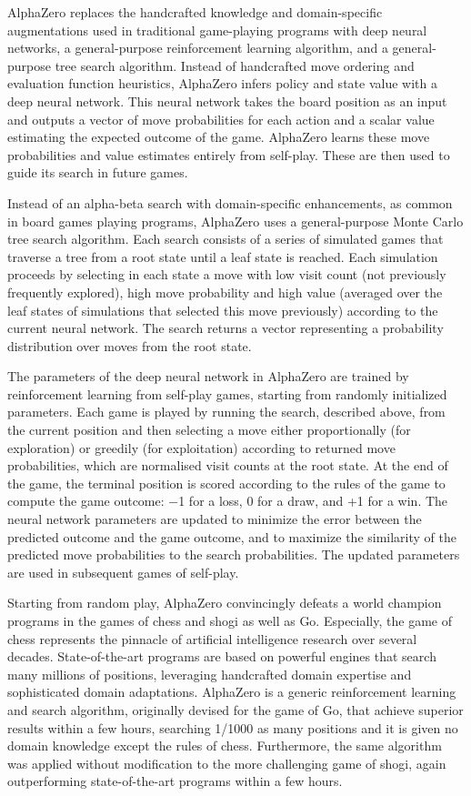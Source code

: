 AlphaZero \cite{Algo.AlphaZero} replaces the handcrafted knowledge and domain-specific augmentations used in traditional game-playing programs with deep neural networks, a general-purpose reinforcement learning algorithm, and a general-purpose tree search algorithm. Instead of handcrafted move ordering and evaluation function heuristics, AlphaZero infers policy and state value with a deep neural network. This neural network takes the board position as an input and outputs a vector of move probabilities for each action and a scalar value estimating the expected outcome of the game. AlphaZero learns these move probabilities and value estimates entirely from self-play. These are then used to guide its search in future games.

Instead of an alpha-beta search with domain-specific enhancements, as common in board games playing programs, AlphaZero uses a general-purpose Monte Carlo tree search \cite{Algo.MCTS} algorithm. Each search consists of a series of simulated games that traverse a tree from a root state until a leaf state is reached. Each simulation proceeds by selecting in each state a move with low visit count (not previously frequently explored), high move probability and high value (averaged over the leaf states of simulations that selected this move previously) according to the current neural network. The search returns a vector representing a probability distribution over moves from the root state.

The parameters of the deep neural network in AlphaZero are trained by reinforcement learning from self-play games, starting from randomly initialized parameters. Each game is played by running the search, described above, from the current position and then selecting a move either proportionally (for exploration) or greedily (for exploitation) according to returned move probabilities, which are normalised visit counts at the root state. At the end of the game, the terminal position is scored according to the rules of the game to compute the game outcome: −1 for a loss, 0 for a draw, and +1 for a win. The neural network parameters are updated to minimize the error between the predicted outcome and the game outcome, and to maximize the similarity of the predicted move probabilities to the search probabilities. The updated parameters are used in subsequent games of self-play.

Starting from random play, AlphaZero convincingly defeats a world champion programs in the games of chess and shogi as well as Go. Especially, the game of chess represents the pinnacle of artificial intelligence research over several decades. State-of-the-art programs are based on powerful engines that search many millions of positions, leveraging handcrafted domain expertise and sophisticated domain adaptations. AlphaZero is a generic reinforcement learning and search algorithm, originally devised for the game of Go, that achieve superior results within a few hours, searching 1/1000 as many positions and it is given no domain knowledge except the rules of chess. Furthermore, the same algorithm was applied without modification to the more challenging game of shogi, again outperforming state-of-the-art programs within a few hours.

